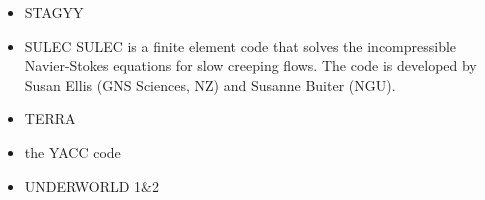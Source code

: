 \begin{itemize}
\item STAGYY
\cite{rota11}
\cite{yadl14}
\cite{crta14}

\item SULEC
SULEC is a finite element code that solves the incompressible Navier-Stokes equations 
for slow creeping flows. The code is developed by Susan Ellis 
(GNS Sciences, NZ) and Susanne Buiter (NGU). 

\cite{qube11}
\cite{ellw11}
\cite{buit12}
\cite{tebu12} 
\cite{crsg12}
\cite{grel12}
\cite{ghbu13}
\cite{ghbu14}
\cite{qubu14}
\cite{qubt14} 
\cite{nabu15}
\cite{zwsn16}
\cite{tebu17}










\item TERRA
\cite{burb97}
\cite{burl98}
\cite{phbs09}
\cite{wodd09}
\cite{woda11}
\cite{dadb13}
\cite{vade16}



\item the YACC code

\cite{tosn15}
\cite{tomy16}


\item UNDERWORLD 1\&2
\cite{stfs06}
\cite{moql07} 
\cite{stfs07}
\cite{lemm08}
\cite{ozrl08}
\cite{casm10}
\cite{mamb10}
\cite{stsf10}
\cite{stfc10}
\cite{fasm10}
\cite{cafz11}
\cite{cafa12}
\cite{bemm13}
\cite{scmo13}
\cite{faca13}
\cite{famc14}
\cite{quxm15}
\cite{bemm15}
\cite{scsp15}
\cite{shmj15}
\cite{shmv16}
\cite{onlw16}
\cite{kicf16}
\cite{memm18}
\cite{samo19}


\end{itemize}
